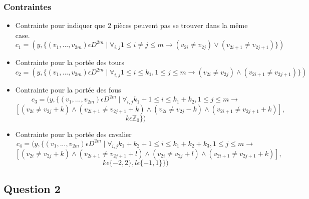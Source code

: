 \documentclass[a4paper,11pt]{article}
\begin{document}
\subsubsection{Contraintes}
\begin{itemize}
\item Contrainte pour indiquer que 2 pièces peuvent pas se trouver dans la même case.
   $$c_{1} = ( y, \{ (v_{1}, ..., v_{2m}) \epsilon  D^{2m} \mid \forall_{i,j} 1\leq i \neq j \leq m \rightarrow (v_{2i} \neq v_{2j}) \vee  (v_{2i+1} \neq v_{2j+1}) \} ) $$
\item Contrainte pour la portée des tours 
 $$ c_{2} = ( y, \{ (v_{1}, ..., v_{2m}) \epsilon  D^{2m} \mid \forall_{i,j} 1\leq i \leq k_{1}, 1\leq j \leq m  \rightarrow (v_{2i} \neq v_{2j}) \wedge  (v_{2i+1} \neq v_{2j+1}) \} ) $$

\item Contrainte pour la portée des fous 
  $$c_{3} = ( y, \{ (v_{1}, ..., v_{2m}) \epsilon  D^{2m} \mid \forall_{i,j} k_{1}+1\leq i \leq k_{1}+k_{2}, 1\leq j \leq m \rightarrow$$
  $$[ (v_{2i} \neq v_{2j}+k) \wedge  (v_{2i+1} \neq v_{2j+1}+k) \wedge  (v_{2i} \neq v_{2j}-k) \wedge  (v_{2i+1} \neq v_{2j+1}+k) ],$$
  $$k \epsilon \mathbb{Z}_{0} \} ) $$

\item Contrainte pour la portée des cavalier 
  $$ c_{4} = ( y, \{ (v_{1}, ..., v_{2m}) \epsilon  D^{2m} \mid \forall_{i,j} k_{1}+k_{2}+1\leq i \leq k_{1}+k_{2}+k_{3}, 1\leq j \leq m \rightarrow$$
  $$[(v_{2i} \neq v_{2j}+k) \wedge  (v_{2i+1} \neq v_{2j+1}+l) \wedge  (v_{2i} \neq v_{2j}+l) \wedge  (v_{2i+1} \neq v_{2j+1}+k) ],$$
  $$k \epsilon \{-2, 2\}, l \epsilon \{-1, 1\} \} )$$

\end{itemize}

\subsection{Question 2}
\end{document}
